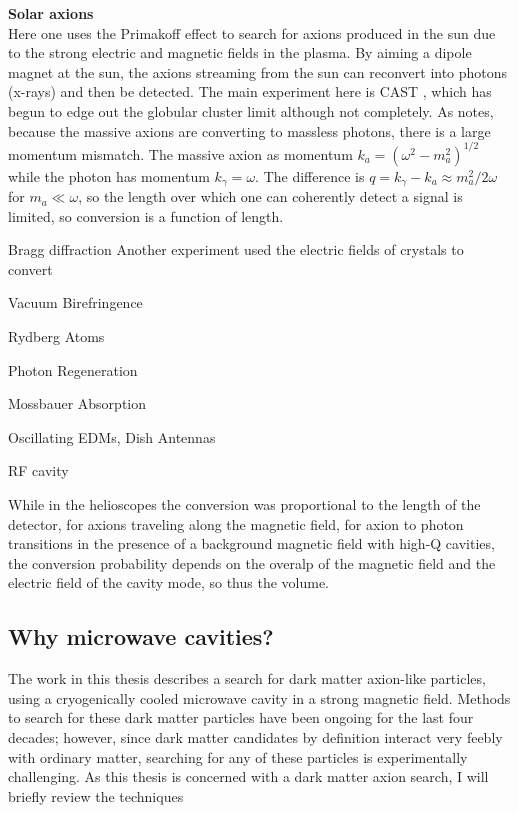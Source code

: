 \documentclass[12pt,twosides]{book}
\begin{document}
\begin{description}

\item \textbf{Solar axions} \hfill \\

Here one uses the Primakoff effect to search for axions produced in the sun due to the strong electric and magnetic fields in the plasma. By aiming a dipole magnet at the sun, the axions streaming from the sun can reconvert into photons (x-rays) and then be detected. The main experiment here is CAST \cite{cast11}, which has begun to edge out the globular cluster limit although not completely.  As \cite{raffelt08} notes, because the massive axions are converting to massless photons, there is a large momentum mismatch. The massive axion as momentum $k_a = (\omega^2 - m_a^2)^{1/2}$ while the photon has momentum $k_\gamma = \omega$. The difference is $q = k_\gamma - k_a \approx m_a^2/2\omega$ for $m_a \ll \omega$, so the length over which one can coherently detect a signal is limited, so conversion is a function of length.

\item{Bragg diffraction}
Another experiment used the electric fields of crystals to convert 

\item{Vacuum Birefringence}

\item{Rydberg Atoms}

\item{Photon Regeneration}


\item{Mossbauer Absorption}

\item{Oscillating EDMs, Dish Antennas}

\item{RF cavity}

While in the helioscopes the conversion was proportional to the length of the detector, for axions traveling along the magnetic field, for axion to photon transitions in the presence of a background magnetic field with high-Q cavities, the conversion probability depends on the overalp of the magnetic field and the electric field of the cavity mode, so thus the volume.

\subsection{Why microwave cavities?}
The work in this thesis describes a search for dark matter axion-like particles, using a cryogenically cooled microwave cavity in a strong magnetic field. Methods to search for these dark matter particles have been ongoing for the last four decades; however, since dark matter candidates by definition interact very feebly with ordinary matter, searching for any of these particles is experimentally challenging.  As this thesis is concerned with a dark matter axion search, I will briefly review the techniques




\end{description}
\end{document}
